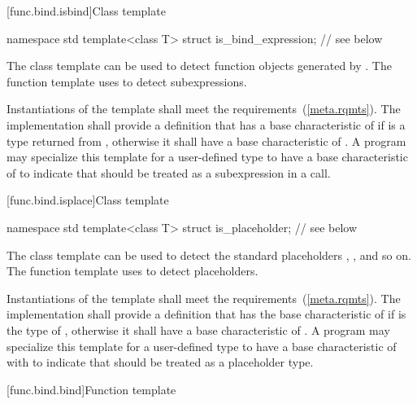 [func.bind.isbind]{Class template }

%
\begin{codeblock}
namespace std {
  template<class T> struct is_bind_expression;  // see below
}
\end{codeblock}

\pnum
The class template  can be used to detect function objects
generated by . The function template 
uses  to detect subexpressions.

\pnum
Instantiations of the  template shall meet
the  requirements~(\ref{meta.rqmts}). The implementation
shall provide a definition that has a base characteristic of
 if  is a type returned from ,
otherwise it shall have a base characteristic of .
A program may specialize this template for a user-defined type 
to have a base characteristic of  to indicate that
 should be treated as a subexpression in a  call.

[func.bind.isplace]{Class template }

%
\begin{codeblock}
namespace std {
  template<class T> struct is_placeholder;      // see below
}
\end{codeblock}

\pnum
The class template  can be used to detect the standard placeholders
, , and so on. The function template  uses
 to detect placeholders.

\pnum
Instantiations of the  template shall meet
the  requirements~(\ref{meta.rqmts}). The implementation
shall provide a definition that has the base characteristic of
 if  is the type of
, otherwise it shall have a
base characteristic of . A program
may specialize this template for a user-defined type  to
have a base characteristic of 
with  to indicate that  should be
treated as a placeholder type.

[func.bind.bind]{Function template }

